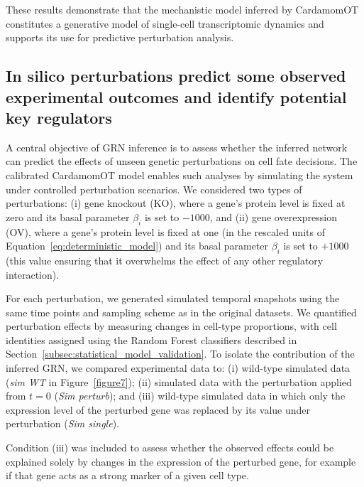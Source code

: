 \documentclass[a4paper, 11pt]{article}
\theoremstyle{plain}
\theoremstyle{remark}
\newcommand*{\firstreview}[1]{{\color{black}#1}}
\begin{document}
These results demonstrate that the mechanistic model inferred by CardamomOT constitutes a generative model of single-cell transcriptomic dynamics and supports its use for predictive perturbation analysis.

\subsection{\texorpdfstring{\firstreview{In silico perturbations predict some observed experimental outcomes and identify potential key regulators}}{In silico perturbations predict some observed experimental outcomes and identify potential key regulators}}
\label{subsec:perturbation_analysis}

A central objective of GRN inference is to assess whether the inferred network can predict the effects of unseen genetic perturbations on cell fate decisions. The calibrated CardamomOT model enables such analyses by simulating the system under controlled perturbation scenarios. We considered two types of perturbations: (i) gene knockout (KO), where a gene's protein level is fixed at zero and its basal parameter $\beta_i$ is set to $-1000$, and (ii) gene overexpression (OV), where a gene's protein level is fixed at one (in the rescaled units of Equation~\eqref{eq:deterministic_model}) and its basal parameter $\beta_i$ is set to $+1000$ (this value ensuring that it overwhelms the effect of any other regulatory interaction).

For each perturbation, we generated simulated temporal snapshots using the same time points and sampling scheme as in the original datasets. We quantified perturbation effects by measuring changes in cell-type proportions, with cell identities assigned using the Random Forest classifiers described in Section~\ref{subsec:statistical_model_validation}. To isolate the contribution of the inferred GRN, we compared experimental data to: (i) wild-type simulated data (\textit{sim WT} in Figure~\ref{figure7}); (ii) simulated data with the perturbation applied from $t = 0$ (\textit{Sim perturb}); and (iii) wild-type simulated data in which only the expression level of the perturbed gene was replaced by its value under perturbation (\textit{Sim single}). 

\firstreview{Condition (iii) was included to assess whether the observed effects could be
explained solely by changes in the expression of the perturbed gene, for example
if that gene acts as a strong marker of a given cell type.}
\end{document}

